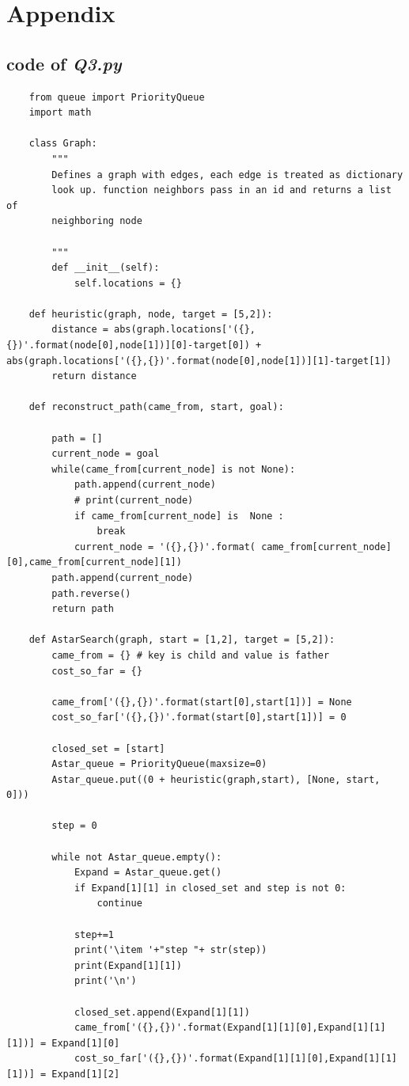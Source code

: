 \documentclass[aps,letterpaper,10pt]{revtex4}
\begin{document}
\section{Appendix}

\subsection{code of \emph{Q3.py}}
\begin{lstlisting}
	from queue import PriorityQueue
	import math

	class Graph:
		"""
		Defines a graph with edges, each edge is treated as dictionary
		look up. function neighbors pass in an id and returns a list of 
		neighboring node
		
		"""
		def __init__(self):
			self.locations = {}

	def heuristic(graph, node, target = [5,2]):
		distance = abs(graph.locations['({},{})'.format(node[0],node[1])][0]-target[0]) + abs(graph.locations['({},{})'.format(node[0],node[1])][1]-target[1])
		return distance

	def reconstruct_path(came_from, start, goal):

		path = []
		current_node = goal
		while(came_from[current_node] is not None):
			path.append(current_node)
			# print(current_node)
			if came_from[current_node] is  None :
				break
			current_node = '({},{})'.format( came_from[current_node][0],came_from[current_node][1])
		path.append(current_node)
		path.reverse()
		return path

	def AstarSearch(graph, start = [1,2], target = [5,2]):
		came_from = {} # key is child and value is father
		cost_so_far = {}
		
		came_from['({},{})'.format(start[0],start[1])] = None
		cost_so_far['({},{})'.format(start[0],start[1])] = 0

		closed_set = [start]
		Astar_queue = PriorityQueue(maxsize=0)
		Astar_queue.put((0 + heuristic(graph,start), [None, start, 0]))

		step = 0

		while not Astar_queue.empty():
			Expand = Astar_queue.get()
			if Expand[1][1] in closed_set and step is not 0:  
				continue

			step+=1
			print('\item '+"step "+ str(step))
			print(Expand[1][1])
			print('\n')

			closed_set.append(Expand[1][1])
			came_from['({},{})'.format(Expand[1][1][0],Expand[1][1][1])] = Expand[1][0]
			cost_so_far['({},{})'.format(Expand[1][1][0],Expand[1][1][1])] = Expand[1][2]


\end{lstlisting}
\end{document}
